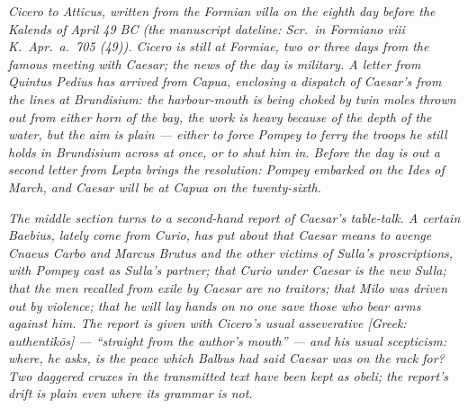 
\textit{Cicero to Atticus, written from the Formian villa
on the eighth day before the Kalends of April 49 BC
(the manuscript dateline: \textit{Scr.\ in Formiano viii
K.\ Apr.\ a.\ 705 (49)}). Cicero is still at Formiae, two
or three days from the famous meeting with Caesar; the
news of the day is military. A letter from Quintus Pedius
has arrived from Capua, enclosing a dispatch of Caesar's
from the lines at Brundisium: the harbour-mouth is being
choked by twin moles thrown out from either horn of the
bay, the work is heavy because of the depth of the water,
but the aim is plain --- either to force Pompey to ferry
the troops he still holds in Brundisium across at once,
or to shut him in. Before the day is out a second letter
from Lepta brings the resolution: Pompey embarked on the
Ides of March, and Caesar will be at Capua on the
twenty-sixth.}

\textit{The middle section turns to a second-hand report
of Caesar's table-talk. A certain Baebius, lately come
from Curio, has put about that Caesar means to avenge
Cnaeus Carbo and Marcus Brutus and the other victims of
Sulla's proscriptions, with Pompey cast as Sulla's
partner; that Curio under Caesar is the new Sulla; that
the men recalled from exile by Caesar are no traitors;
that Milo was driven out by violence; that he will lay
hands on no one save those who bear arms against him. The
report is given with Cicero's usual asseverative
\textit{[Greek: authentik\=os]} --- ``straight from the
author's mouth'' --- and his usual scepticism: where, he
asks, is the peace which Balbus had said Caesar was on
the rack for? Two daggered cruxes in the transmitted text
have been kept as obeli; the report's drift is plain even
where its grammar is not.}
